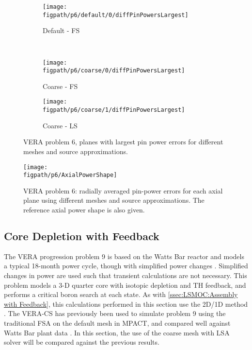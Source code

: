 {{{      \begin{figure}[htbp]
        \centering
        \begin{subfigure}[t]{0.49\textwidth}
          \centering
          \texttt{[image: \\figpath/p6/default/0/diffPinPowersLargest]}
          \caption{Default - FS\label{fig:LSMOC:P6:Default-FS:LargestPinPowerErrors}}
        \end{subfigure}%
        ~
        \begin{subfigure}[t]{0.49\textwidth}
          \centering
          \texttt{[image: \\figpath/p6/coarse/0/diffPinPowersLargest]}
          \caption{Coarse - FS\label{fig:LSMOC:P6:Coarse-FS:LargestPinPowerErrors}}
        \end{subfigure}
        \begin{subfigure}[t]{0.49\textwidth}
          \centering
          \texttt{[image: \\figpath/p6/coarse/1/diffPinPowersLargest]}
          \caption{Coarse - LS\label{fig:LSMOC:P6:Coarse-LS:LargestPinPowerErrors}}
        \end{subfigure}
        \caption{VERA problem 6, planes with largest pin power errors for different meshes and source approximations.}
        \label{figs:LSMOC:P6:LargestPinPowerErrors}
      \end{figure}

      \begin{figure}[htbp]
        \centering
        \texttt{[image: \\figpath/p6/AxialPowerShape]}
        \caption{VERA problem 6: radially averaged pin-power errors for each axial plane using different meshes and source approximations.
                 The reference axial power shape is also given. \label{fig:LSMOC:P6:AxialPowerShape}}
      \end{figure}
    }

    \subsection{Core Depletion with Feedback}{\label{ssec:LSMOC:Core Depletion with Feedback}
      The \ac{VERA} progression problem 9 is based on the Watts Bar reactor and models a typical 18-month power cycle, though with simplified power changes \cite{VERA,VERAProblems}.
      Simplified changes in power are used such that transient calculations are not necessary.
      This problem models a 3-D quarter core with isotopic depletion and \ac{TH} feedback, and performs a critical boron search at each state.
      As with \cref{ssec:LSMOC:Assembly with Feedback}, this calculations performed in this section use the 2D/1D method \cite{Collins2016,VERA}.
      The \ac{VERA-CS} has previously been used to simulate problem 9 using the traditional \ac{FSA} on the default mesh in MPACT, and compared well against Watts Bar plant data \cite{VERA}.
      In this section, the use of the coarse mesh with \ac{LSA} solver will be compared against the previous results.

}}}
